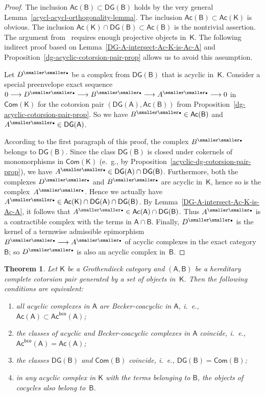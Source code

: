 \documentclass[12pt,a4paper]{amsart}
\newcommand{\+}{\nobreakdash-}
\renewcommand{\:}{\colon}
\newcommand{\rarrow}{\longrightarrow}
\newcommand{\bu}{{\text{\smaller\smaller$\scriptstyle\bullet$}}}
\newcommand{\sA}{\mathsf A}
\newcommand{\sB}{\mathsf B}
\newcommand{\sK}{\mathsf K}
\newcommand{\Com}{\mathsf{Com}}
\newcommand{\Ac}{\mathsf{Ac}}
\newcommand{\DG}{\mathsf{DG}}
\newcommand{\bco}{\mathsf{bco}}
\theoremstyle{plain}
\newtheorem{thm}{Theorem}[section]
\theoremstyle{definition}
\begin{document}
\begin{proof}
 The inclusion $\Ac(\sB)\subset\DG(\sB)$ holds by the very general
Lemma~\ref{acycl-acycl-orthogonality-lemma}.
 The inclusion $\Ac(\sB)\subset\Ac(\sK)$ is obvious.
 The inclusion $\Ac(\sK)\cap\DG(\sB)\subset\Ac(\sB)$ is the nontrivial
assertion.
 The argument from~\cite[Theorem~3.12]{Gil} requires enough projective
objects in~$\sK$.
 The following indirect proof based on
Lemma~\ref{DG-A-intersect-Ac-K-is-Ac-A} and
Proposition~\ref{dg-acyclic-cotorsion-pair-prop} allows us to avoid
this assumption.

 Let $D^\bu$ be a complex from $\DG(\sB)$ that is acyclic in~$\sK$.
 Consider a special preenvelope exact sequence $0\rarrow D^\bu\rarrow
B^\bu\rarrow A^\bu\rarrow0$ in $\Com(\sK)$ for the cotorsion pair
$(\DG(\sA),\Ac(\sB))$ from
Proposition~\ref{dg-acyclic-cotorsion-pair-prop}.
 So we have $B^\bu\in\Ac(\sB)$ and $A^\bu\in\DG(\sA)$.

 According to the first paragraph of this proof, the complex $B^\bu$
belongs to $\DG(\sB)$.
 Since the class $\DG(\sB)$ is closed under cokernels of monomorphisms
in $\Com(\sK)$ (e.~g., by
Proposition~\ref{acyclic-dg-cotorsion-pair-prop}), we have
$A^\bu\in\DG(\sA)\cap\DG(\sB)$.
 Furthermore, both the complexes $D^\bu$ and $B^\bu$ are acyclic
in~$\sK$, hence so is the complex~$A^\bu$.
 Hence we actually have $A^\bu\in\Ac(\sK)\cap\DG(\sA)\cap\DG(\sB)$.
 By Lemma~\ref{DG-A-intersect-Ac-K-is-Ac-A}, it follows that
$A^\bu\in\Ac(\sA)\cap\DG(\sB)$.
 Thus $A^\bu$ is a contractible complex with the terms in $\sA\cap\sB$.
 Finally, $D^\bu$ is the kernel of a termwise admissible epimorphism
$B^\bu\rarrow A^\bu$ of acyclic complexes in the exact category~$\sB$;
so $D^\bu$ is also an acyclic complex in~$\sB$.
\end{proof}

\begin{thm} \label{cotorsion-periodity-type-equivalent-conditions}
 Let\/ $\sK$ be a Grothendieck category and $(\sA,\sB)$ be
a hereditary complete cotorsion pair generated by a set of objects\/
in\/~$\sK$.
 Then the following conditions are equivalent:
\begin{enumerate}
\item all acyclic complexes in\/ $\sA$ are Becker-coacyclic in\/ $\sA$,
i.~e., $\Ac(\sA)\subset\Ac^\bco(\sA)$;
\item the classes of acyclic and Becker-coacyclic complexes in\/ $\sA$
coincide, i.~e., $\Ac^\bco(\sA)=\Ac(\sA)$;
\item the classes\/ $\DG(\sB)$ and\/ $\Com(\sB)$ coincide, i.~e.,
$\DG(\sB)=\Com(\sB)$;
\item in any acyclic complex in\/ $\sK$ with the terms belonging
to\/ $\sB$, the objects of cocycles also belong to\/~$\sB$.
\end{enumerate}
\end{thm}
\end{document}
